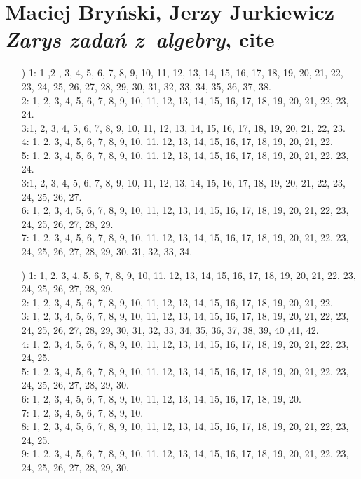 \documentclass[a4paper,11pt]{article}
\numberwithin{equation}{section}
\begin{document}
\section{Maciej Bryński, Jerzy Jurkiewicz \textit{Zarys zadań
    z~algebry}, cite{}}

\label{sec:Oznaczenia-i-konwencje}


\begin{itemize}

\item[\romannumeral1)] 1: 1 ,2 , 3, 4, 5, 6, 7, 8, 9, 10, 11, 12, 13, 14,
  15, 16, 17, 18, 19, 20, 21, 22, 23, 24, 25, 26, 27, 28, 29, 30, 31, 32,
  33, 34, 35, 36, 37, 38. \\
  2: 1, 2, 3, 4, 5, 6, 7, 8, 9, 10, 11, 12, 13, 14, 15, 16, 17, 18, 19, 20,
  21, 22, 23, 24. \\
  3:1, 2, 3, 4, 5, 6, 7, 8, 9, 10, 11, 12, 13, 14, 15, 16, 17, 18, 19, 20,
  21, 22, 23. \\
  4: 1, 2, 3, 4, 5, 6, 7, 8, 9, 10, 11, 12, 13, 14, 15, 16, 17, 18, 19, 20,
  21, 22. \\
  5: 1, 2, 3, 4, 5, 6, 7, 8, 9, 10, 11, 12, 13, 14, 15, 16, 17, 18, 19,
  20, 21, 22, 23, 24. \\
  3:1, 2, 3, 4, 5, 6, 7, 8, 9, 10, 11, 12, 13, 14, 15, 16, 17, 18, 19, 20,
  21, 22, 23, 24, 25, 26, 27. \\
  6: 1, 2, 3, 4, 5, 6, 7, 8, 9, 10, 11, 12, 13, 14, 15, 16, 17, 18, 19, 20,
  21, 22, 23, 24, 25, 26, 27, 28, 29. \\
  7: 1, 2, 3, 4, 5, 6, 7, 8, 9, 10, 11, 12, 13, 14, 15, 16, 17, 18, 19, 20,
  21, 22, 23, 24, 25, 26, 27, 28, 29, 30, 31, 32, 33, 34.

\item[\romannumeral2)] 1: 1, 2, 3, 4, 5, 6, 7, 8, 9, 10, 11, 12, 13, 14, 15,
  16, 17, 18, 19, 20, 21, 22, 23, 24, 25, 26, 27, 28, 29. \\
  2: 1, 2, 3, 4, 5, 6, 7, 8, 9, 10, 11, 12, 13, 14, 15, 16, 17, 18, 19, 20,
  21, 22. \\
  3: 1, 2, 3, 4, 5, 6, 7, 8, 9, 10, 11, 12, 13, 14, 15, 16, 17, 18, 19, 20,
  21, 22, 23, 24, 25, 26, 27, 28, 29, 30, 31, 32, 33, 34, 35, 36, 37, 38,
  39, 40 ,41, 42. \\
  4: 1, 2, 3, 4, 5, 6, 7, 8, 9, 10, 11, 12, 13, 14, 15, 16, 17, 18, 19, 20,
  21, 22, 23, 24, 25. \\
  5: 1, 2, 3, 4, 5, 6, 7, 8, 9, 10, 11, 12, 13, 14, 15, 16, 17, 18, 19, 20,
  21, 22, 23, 24, 25, 26, 27, 28, 29, 30. \\
  6: 1, 2, 3, 4, 5, 6, 7, 8, 9, 10, 11, 12, 13, 14, 15, 16, 17, 18, 19,
  20. \\
  7: 1, 2, 3, 4, 5, 6, 7, 8, 9, 10. \\
  8: 1, 2, 3, 4, 5, 6, 7, 8, 9, 10, 11, 12, 13, 14, 15, 16, 17, 18, 19, 20,
  21, 22, 23, 24, 25. \\
  9: 1, 2, 3, 4, 5, 6, 7, 8, 9, 10, 11, 12, 13, 14, 15, 16, 17, 18, 19, 20,
  21, 22, 23, 24, 25, 26, 27, 28, 29, 30.


\end{itemize}
\end{document}
